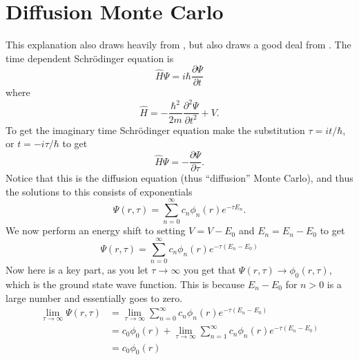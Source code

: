 \section*{Diffusion Monte Carlo}
This explanation also draws heavily from \cite{foulkes2001}, but also draws a good deal from \cite{kosztin1996}. The time dependent Schr\"odinger equation is
\begin{equation}
  \hat H \Psi = i \hbar \frac{\partial \Psi}{\partial t}
\end{equation}
where
\begin{equation}
  \hat H = -\frac{\hbar^2}{2m}\frac{\partial^2\Psi}{\partial t^2} + V.
\end{equation}
To get the imaginary time Schr\"odinger equation make the substitution $\tau=i t/\hbar$, or $t=-i \tau / \hbar$ to get
\begin{equation}
  \hat H \Psi = - \frac{\partial \Psi}{\partial \tau}.
\end{equation}
Notice that this is the diffusion equation (thus ``diffusion'' Monte Carlo), and thus the solutions to this consists of exponentials
\begin{equation}
  \Psi(r,\tau) = \sum\limits_{n=0}^\infty c_n \phi_n(r) e^{- \tau E_n}.
\end{equation}
We now perform an energy shift to setting $V=V-E_0$ and $E_n=E_n-E_0$ to get
\begin{equation}
  \Psi(r,\tau) = \sum\limits_{n=0}^\infty c_n \phi_n(r) e^{- \tau (E_n-E_0)}
\end{equation}
Now here is a key part, as you let $\tau \rightarrow \infty$ you get that $\Psi(r,\tau) \rightarrow \phi_0(r,\tau)$, which is the ground state wave function. This is because $E_n-E_0$ for $n>0$ is a large number and essentially goes to zero.
\begin{equation}
  \begin{split}
    \lim_{\tau \to \infty} \Psi(r,\tau) &= \lim_{\tau \to \infty} \sum\limits_{n=0}^\infty c_n \phi_n(r) e^{- \tau (E_n-E_0)} \\
    &= c_0 \phi_0(r) + \lim_{\tau \to \infty} \sum\limits_{n=1}^\infty c_n \phi_n(r) e^{- \tau (E_n-E_0)} \\
    &= c_0 \phi_0(r)
  \end{split}
\end{equation}

